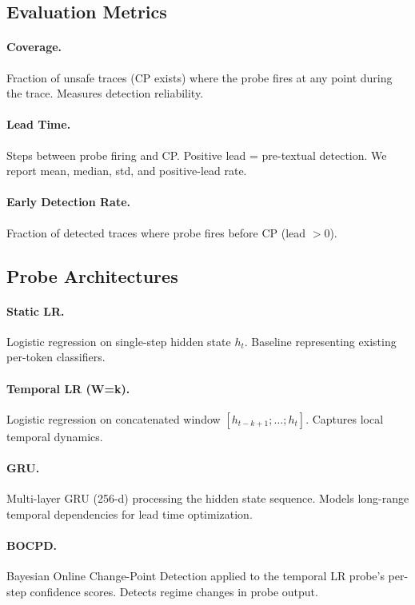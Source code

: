 \documentclass[11pt,a4paper]{article}
\begin{document}
\subsection{Evaluation Metrics}

\paragraph{Coverage.} Fraction of unsafe traces (CP exists) where the probe fires at any point during the trace. Measures detection reliability.

\paragraph{Lead Time.} Steps between probe firing and CP. Positive lead = pre-textual detection. We report mean, median, std, and positive-lead rate.

\paragraph{Early Detection Rate.} Fraction of detected traces where probe fires before CP (lead $> 0$).

\subsection{Probe Architectures}

\paragraph{Static LR.} Logistic regression on single-step hidden state $h_t$. Baseline representing existing per-token classifiers.

\paragraph{Temporal LR (W=k).} Logistic regression on concatenated window $[h_{t-k+1}; \ldots; h_t]$. Captures local temporal dynamics.

\paragraph{GRU.} Multi-layer GRU (256-d) processing the hidden state sequence. Models long-range temporal dependencies for lead time optimization.

\paragraph{BOCPD.} Bayesian Online Change-Point Detection applied to the temporal LR probe's per-step confidence scores. Detects regime changes in probe output.
\end{document}
